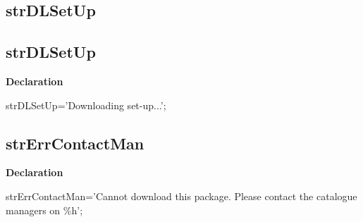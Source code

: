 \documentclass{report}
\newif\ifpdf
\begin{document}
\subsection*{\large{\textbf{strDLSetUp}}\normalsize\hspace{1ex}\hrulefill}
\else
\subsection*{strDLSetUp}
\fi
\label{trstrings-strDLSetUp}
\begin{list}{}{
\setlength{\itemindent}{0cm}
\setlength{\listparindent}{0cm}
\setlength{\leftmargin}{\evensidemargin}
\addtolength{\leftmargin}{\tmplength}
\settowidth{\labelsep}{X}
\addtolength{\leftmargin}{\labelsep}
\setlength{\labelwidth}{\tmplength}
}
\item[\textbf{Declaration}\hfill]
\ifpdf
\begin{flushleft}
\fi
\begin{ttfamily}
strDLSetUp='Downloading set-up...';\end{ttfamily}

\ifpdf
\end{flushleft}
\fi

\end{list}
\ifpdf
\subsection*{\large{\textbf{strErrContactMan}}\normalsize\hspace{1ex}\hrulefill}
\else
\subsection*{strErrContactMan}
\fi
\label{trstrings-strErrContactMan}
\begin{list}{}{
\setlength{\itemindent}{0cm}
\setlength{\listparindent}{0cm}
\setlength{\leftmargin}{\evensidemargin}
\addtolength{\leftmargin}{\tmplength}
\settowidth{\labelsep}{X}
\addtolength{\leftmargin}{\labelsep}
\setlength{\labelwidth}{\tmplength}
}
\item[\textbf{Declaration}\hfill]
\ifpdf
\begin{flushleft}
\fi
\begin{ttfamily}
strErrContactMan='Cannot download this package. Please contact the catalogue managers on {\%}h';\end{ttfamily}

\ifpdf
\end{flushleft}
\fi

\end{list}
\ifpdf
\end{document}
